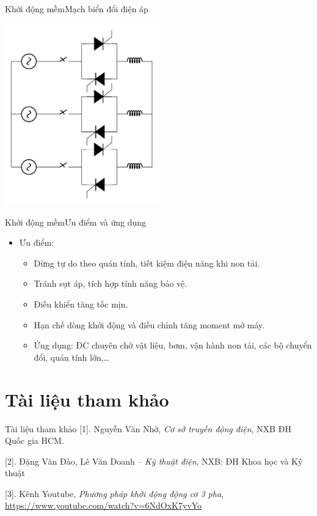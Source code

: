 \documentclass[17pt]{beamer}
\begin{document}
\begin{frame}{Khởi động mềm}{Mạch biển đổi điện áp}
\vspace{-1cm}
\begin{center}
\includegraphics[width = 0.5\textwidth,angle=-90]{../sodomach/khoidongmem.pdf}
\end{center}
\end{frame}
\begin{frame}{Khởi động mềm}{Ưu điểm và ứng dụng}
\begin{itemize}
\item \alert{Ưu điểm:}
\begin{itemize}
\item Dừng tự do theo quán tính, tiết kiệm điện năng khi non tải.
\item Tránh sụt áp, tích hợp tính năng bảo vệ.
\item Điều khiển tăng tốc mịn.
\item Hạn chế dòng khởi động và điều chỉnh tăng moment mở máy.
\item \alert{Ứng dụng:} ĐC chuyên chở vật liệu, bơm, vận hành non tải, các bộ chuyển đổi, quán tính lớn,\ldots
\end{itemize}
\end{itemize}
\end{frame}

\section*{Tài liệu tham khảo}
\begin{frame}{Tài liệu tham khảo}
[1]. Nguyễn Văn Nhờ, \textit{Cơ sở truyền động điện}, NXB ĐH Quốc gia HCM.

[2]. Đặng Văn Đào, Lê Văn Doanh -- \textit{Kỹ thuật điện}, NXB: ĐH Khoa học và Kỹ thuật

[3]. Kênh Youtube, \textit{Phương pháp khởi động động cơ 3 pha}, \url{https://www.youtube.com/watch?v=6NdOxK7yvYo}
\end{frame}
\end{document}
